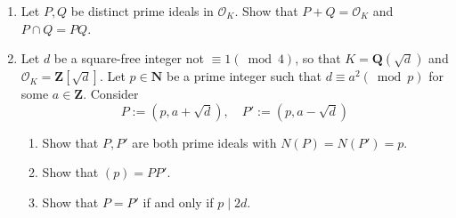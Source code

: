 \documentclass{article}
\begin{document}
\begin{enumerate}
    \item Let $P, Q$ be distinct prime ideals in $\mathcal{O}_K$. Show that $P + Q = \mathcal{O}_K$ and $P \cap Q = PQ$.

    \item Let $d$ be a square-free integer not $\equiv 1 (\bmod 4)$, so that $K = \mathbf{Q}(\sqrt{d})$ and $\mathcal{O}_K = \mathbf{Z}[\sqrt{d}]$. Let $p \in \mathbf{N}$ be a prime integer such that $d \equiv a^2 (\bmod p)$ for some $a \in \mathbf{Z}$. Consider
    \[
    P := (p, a + \sqrt{d}), \quad P' := (p, a - \sqrt{d})
    \]
    \begin{enumerate}
        \item Show that $P, P'$ are both prime ideals with $N(P) = N(P') = p$.
        \item Show that $(p) = PP'$.
        \item Show that $P = P'$ if and only if $p \mid 2d$.
    \end{enumerate}
\end{enumerate}
\end{document}

